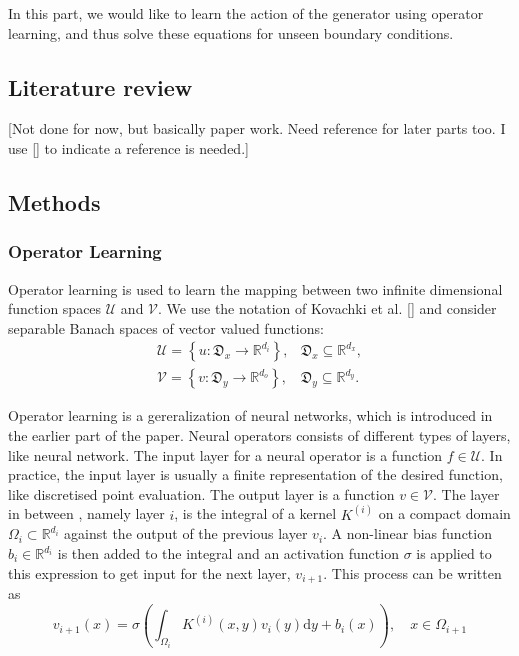 \documentclass{article}
\begin{document}
In this part, we would like to learn the action of the generator using operator learning, and thus solve these equations for unseen boundary conditions. 

\subsection{Literature review}

[Not done for now, but basically paper work. Need reference for later parts too. I use [] to indicate a reference is needed.]
\subsection{Methods}

\subsubsection{Operator Learning}

Operator learning is used to learn the mapping between two infinite dimensional function spaces $\mathcal{U}$ and $\mathcal{V}$. We use the notation of Kovachki et al. [] and consider separable Banach spaces of vector valued functions:
$$
\begin{array}{ll}
\mathcal{U}=\left\{u: \mathfrak{D}_{x} \rightarrow \mathbb{R}^{d_{i}}\right\}, & \mathfrak{D}_{x} \subseteq \mathbb{R}^{d_{x}}, \\
\mathcal{V}=\left\{v: \mathfrak{D}_{y} \rightarrow \mathbb{R}^{d_{o}}\right\}, & \mathfrak{D}_{y} \subseteq \mathbb{R}^{d_{y}} .
\end{array}
$$

Operator learning is a gereralization of neural networks, which is introduced in the earlier part of the paper. Neural operators consists of different types of layers, like neural network. The input layer for a neural operator is a function $f \in \mathcal{U}$. In practice, the input layer is usually a finite representation of the desired function, like discretised point evaluation. The output layer is a function $v \in \mathcal{V}$. The layer in between , namely layer $i$, is the integral of a kernel $K^{(i)}$ on a compact domain $\Omega_{i} \subset \mathbb{R}^{d_{i}}$ against the output of the previous layer $v_{i}$. A non-linear bias function $b_{i} \in \mathbb{R}^{d_{i}}$ is then added to the integral and an activation function $\sigma$ is applied to this expression to get input for the next layer, $v_{i+1}$. This process can be written as
$$
v_{i+1}(x)=\sigma\left(\int_{\Omega_{i}} K^{(i)}(x, y) v_{i}(y) \mathrm{d} y+b_{i}(x)\right), \quad x \in \Omega_{i+1}
$$
\end{document}
